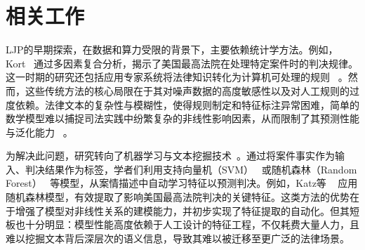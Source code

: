 \section{\heiti 相关工作}
LJP的早期探索，在数据和算力受限的背景下，主要依赖统计学方法。例如，Kort~\cite{kort1957predicting} 通过多因素复合分析，揭示了美国最高法院在处理特定案件时的判决规律。这一时期的研究还包括应用专家系统将法律知识转化为计算机可处理的规则 ~\cite{susskind1986expert}。然而，这些传统方法的核心局限在于其对噪声数据的高度敏感性以及对人工规则的过度依赖。法律文本的复杂性与模糊性，使得规则制定和特征标注异常困难，简单的数学模型难以捕捉司法实践中纷繁复杂的非线性影响因素，从而限制了其预测性能与泛化能力 ~\cite{deng2023syllogistic}。

为解决此问题，研究转向了机器学习与文本挖掘技术~\cite{chen2013text,goncalves2005evaluating}。通过将案件事实作为输入、判决结果作为标签，学者们利用支持向量机（SVM）~\cite{kianmehr2006crime} 或随机森林（Random Forest） ~\cite{sulea2017exploring}等模型，从案情描述中自动学习特征以预测判决。例如，Katz等 ~\cite{sulea2017exploring} 应用随机森林模型，有效提取了影响美国最高法院判决的关键特征。这类方法的优势在于增强了模型对非线性关系的建模能力，并初步实现了特征提取的自动化。但其短板也十分明显：模型性能高度依赖于人工设计的特征工程，不仅耗费大量人力，且难以挖掘文本背后深层次的语义信息，导致其难以被迁移至更广泛的法律场景。


